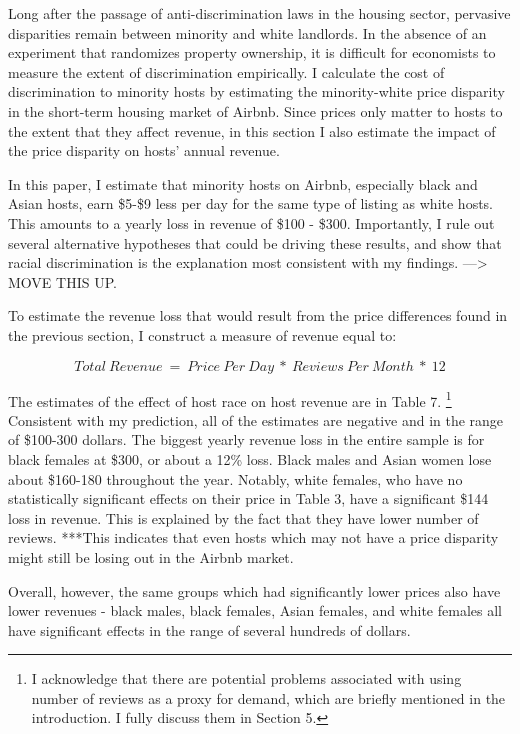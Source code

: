 
Long after the passage of anti-discrimination laws in the housing sector, pervasive disparities remain between minority and white landlords. In the absence of an experiment that randomizes property ownership, it is difficult for economists to measure the extent of discrimination empirically. I calculate the cost of discrimination to minority hosts by estimating the minority-white price disparity in the short-term housing market of Airbnb. Since prices only matter to hosts to the extent that they affect revenue, in this section I also estimate the impact of the price disparity on hosts' annual revenue.

In this paper, I estimate that minority hosts on Airbnb, especially black and Asian hosts, earn \$5-\$9 less per day for the same type of listing as white hosts. This amounts to a yearly loss in revenue of \$100 - \$300. Importantly, I rule out several alternative hypotheses that could be driving these results, and show that racial discrimination is the explanation most consistent with my findings. ---> MOVE THIS UP. 

To estimate the revenue loss that would result from the price differences found in the previous section, I construct a measure of revenue equal to: 

\[Total \: Revenue \ = \ Price \: Per \: Day \ * \ Reviews \: Per \: Month \ * \ 12\] 

The estimates of the effect of host race on host revenue are in Table 7.%
	\footnote{I acknowledge that there are potential problems associated with using number of reviews as a proxy for demand, which are briefly mentioned in the introduction. I fully discuss them in Section 5.} 
Consistent with my prediction, all of the estimates are negative and in the range of \$100-300 dollars. The biggest yearly revenue loss in the entire sample is for black females at \$300, or about a 12\% loss. Black males and Asian women lose about \$160-180 throughout the year. Notably, white females, who have no statistically significant effects on their price in Table 3, have a significant \$144 loss in revenue. This is explained by the fact that they have lower number of reviews. ***This indicates that even hosts which may not have a price disparity might still be losing out in the Airbnb market. 

Overall, however, the same groups which had significantly lower prices also have lower revenues - black males, black females, Asian females, and white females all have significant effects in the range of several hundreds of dollars. 

